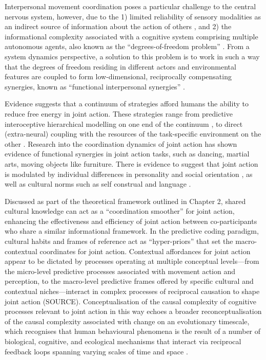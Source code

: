 \begin{CJK}{UTF8}{gbsn}
Interpersonal movement coordination poses a particular challenge to the central nervous system, however, due to the 1) limited reliability of sensory modalities as an indirect source of information about the action of others \citep{Frith2007}, and 2) the informational complexity associated with a cognitive system comprising multiple autonomous agents, also known as the ``degrees-of-freedom problem'' \citep[see ][]{Bernstein1967,Turvey1982,Turvey1990}.  From a system dynamics perspective, a solution to this problem is to work in such a way that the degrees of freedom residing in different actors and environmental features are coupled to form low-dimensional, reciprocally compensating synergies, known as ``functional interpersonal synergies'' \citep{Riley2011}.

Evidence suggests that a continuum of strategies afford humans the ability to reduce free energy in joint action.  These strategies range
from predictive interoceptive hierarchical modelling on one end of the continuum \citep{Pesquita2017}, to direct (extra-neural) coupling with the resources of the task-specific environment on the other \citep{Riley2011}. Research into the coordination dynamics of joint action has shown evidence of functional synergies in joint action tasks, such as dancing, martial arts, moving objects like furniture.
There is evidence to suggest that joint action is modulated by individual differences in personality and social orientation \citep{Marsh2009,Keller2014}, as well as cultural norms such as self construal \citep{Colzato2012} and language \citep{Boroditsky2010}.


Discussed as part of the theoretical framework outlined in Chapter 2, shared cultural knowledge can act as a ``coordination smoother'' \citep{Vesper2017} for joint action, enhancing the effectiveness and efficiency of joint action between co-participants who share a similar informational framework.  In the predictive coding paradigm, cultural habits and frames of reference act as ``hyper-priors'' that set the macro-contextual coordinates for joint action\citep{Clark2013}.  Contextual affordances for joint action appear to be dictated by processes operating at multiple conceptual levels---from the micro-level predictive processes associated with movement action and perception, to the macro-level predictive frames offered by specific cultural and contextual niches---interact in complex processes of reciprocal causation to shape joint action (SOURCE).  Conceptualisation of the causal complexity of cognitive processes relevant to joint action in this way echoes a broader reconceptualisation of the causal complexity associated with change on an evolutionary timescale, which recognises that human behavioural phenomena is the result of a number of biological, cognitive, and ecological mechanisms that interact via reciprocal feedback loops spanning varying scales of time and space \citep{Fuentes2015}.



\end{CJK}
